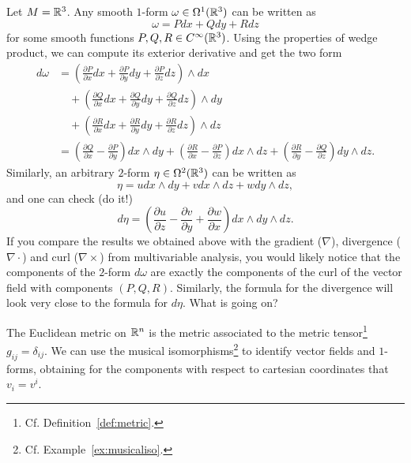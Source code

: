 \begin{example}\label{ex:vectorcalculus}
	Let $M=\mathbb{R}^3$. Any smooth $1$-form $\omega\in\Omega^1(\mathbb{R}^3)$ can be written as
	\begin{equation}
		\omega = P dx + Q dy + R dz
	\end{equation}
	for some smooth functions $P,Q,R\in C^\infty(\mathbb{R}^3)$.
	Using the properties of wedge product, we can compute its exterior derivative and get the two form
	\begin{align}
		d\omega & = \left(\frac{\partial P}{\partial x} dx + \frac{\partial P}{\partial y} dy + \frac{\partial P}{\partial z} dz \right) \wedge dx     \\
		        & \quad+\left(\frac{\partial Q}{\partial x} dx + \frac{\partial Q}{\partial y} dy + \frac{\partial Q}{\partial z} dz \right) \wedge dy \\
		        & \quad+\left(\frac{\partial R}{\partial x} dx + \frac{\partial R}{\partial y} dy + \frac{\partial R}{\partial z} dz \right) \wedge dz \\
		        & = \left(\frac{\partial Q}{\partial x} - \frac{\partial P}{\partial y}\right) dx \wedge dy +
		\left(\frac{\partial R}{\partial x} - \frac{\partial P}{\partial z}\right) dx \wedge dz + \left(\frac{\partial R}{\partial y} - \frac{\partial Q}{\partial z}\right) dy \wedge dz.
	\end{align}
	Similarly, an arbitrary $2$-form $\eta\in\Omega^2(\mathbb{R}^3)$ can be written as
	\begin{equation}
		\eta = u dx\wedge dy + v dx\wedge dz + w dy\wedge dz,
	\end{equation}
	and one can check (do it!)
	\begin{equation}
		d\eta = \left(\frac{\partial u}{\partial z}-\frac{\partial v}{\partial y} + \frac{\partial w}{\partial x}\right) dx\wedge dy \wedge dz.
	\end{equation}
	If you compare the results we obtained above with the gradient ($\nabla$), divergence ($\nabla\cdot$) and curl ($\nabla\times$) from multivariable analysis, you would likely notice that the components of the $2$-form $d\omega$ are exactly the components of the curl of the vector field with components $(P, Q, R)$.
	Similarly, the formula for the divergence will look very close to the formula for $d\eta$.
	What is going on?

	The Euclidean metric on $\mathbb{R}^n$ is the metric associated to the metric tensor\footnote{Cf. Definition~\ref{def:metric}.} $g_{ij} = \delta_{ij}$.
	We can use the musical isomorphisms\footnote{Cf. Example~\ref{ex:musicaliso}.} to identify vector fields and $1$-forms, obtaining for the components with respect to cartesian coordinates that $v_i = v^i$.


\end{example}
